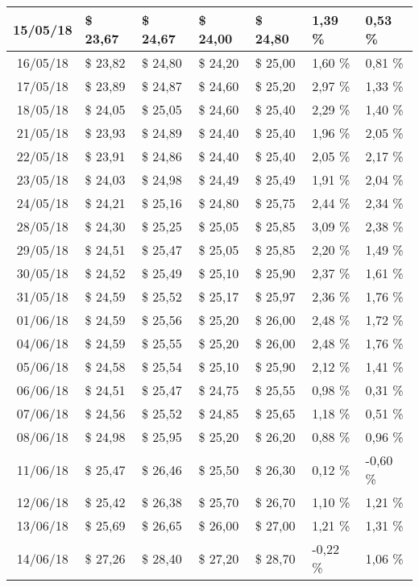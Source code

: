 \begin{center}
\begin{longtable}{|c|p{1.5cm}|p{1.5cm}|p{1.5cm}|p{1.5cm}|p{1.5cm}|p{1.5cm}|}
15/05/18 & \$ 23,67 & \$ 24,67 & \$ 24,00 & \$ 24,80 & 1,39 \% & 0,53 \% \\ \hline
16/05/18 & \$ 23,82 & \$ 24,80 & \$ 24,20 & \$ 25,00 & 1,60 \% & 0,81 \% \\ \hline
17/05/18 & \$ 23,89 & \$ 24,87 & \$ 24,60 & \$ 25,20 & 2,97 \% & 1,33 \% \\ \hline
18/05/18 & \$ 24,05 & \$ 25,05 & \$ 24,60 & \$ 25,40 & 2,29 \% & 1,40 \% \\ \hline
21/05/18 & \$ 23,93 & \$ 24,89 & \$ 24,40 & \$ 25,40 & 1,96 \% & 2,05 \% \\ \hline
22/05/18 & \$ 23,91 & \$ 24,86 & \$ 24,40 & \$ 25,40 & 2,05 \% & 2,17 \% \\ \hline
23/05/18 & \$ 24,03 & \$ 24,98 & \$ 24,49 & \$ 25,49 & 1,91 \% & 2,04 \% \\ \hline
24/05/18 & \$ 24,21 & \$ 25,16 & \$ 24,80 & \$ 25,75 & 2,44 \% & 2,34 \% \\ \hline
28/05/18 & \$ 24,30 & \$ 25,25 & \$ 25,05 & \$ 25,85 & 3,09 \% & 2,38 \% \\ \hline
29/05/18 & \$ 24,51 & \$ 25,47 & \$ 25,05 & \$ 25,85 & 2,20 \% & 1,49 \% \\ \hline
30/05/18 & \$ 24,52 & \$ 25,49 & \$ 25,10 & \$ 25,90 & 2,37 \% & 1,61 \% \\ \hline
31/05/18 & \$ 24,59 & \$ 25,52 & \$ 25,17 & \$ 25,97 & 2,36 \% & 1,76 \% \\ \hline
01/06/18 & \$ 24,59 & \$ 25,56 & \$ 25,20 & \$ 26,00 & 2,48 \% & 1,72 \% \\ \hline
04/06/18 & \$ 24,59 & \$ 25,55 & \$ 25,20 & \$ 26,00 & 2,48 \% & 1,76 \% \\ \hline
05/06/18 & \$ 24,58 & \$ 25,54 & \$ 25,10 & \$ 25,90 & 2,12 \% & 1,41 \% \\ \hline
06/06/18 & \$ 24,51 & \$ 25,47 & \$ 24,75 & \$ 25,55 & 0,98 \% & 0,31 \% \\ \hline
07/06/18 & \$ 24,56 & \$ 25,52 & \$ 24,85 & \$ 25,65 & 1,18 \% & 0,51 \% \\ \hline
08/06/18 & \$ 24,98 & \$ 25,95 & \$ 25,20 & \$ 26,20 & 0,88 \% & 0,96 \% \\ \hline
11/06/18 & \$ 25,47 & \$ 26,46 & \$ 25,50 & \$ 26,30 & 0,12 \% & -0,60 \% \\ \hline
12/06/18 & \$ 25,42 & \$ 26,38 & \$ 25,70 & \$ 26,70 & 1,10 \% & 1,21 \% \\ \hline
13/06/18 & \$ 25,69 & \$ 26,65 & \$ 26,00 & \$ 27,00 & 1,21 \% & 1,31 \% \\ \hline
14/06/18 & \$ 27,26 & \$ 28,40 & \$ 27,20 & \$ 28,70 & -0,22 \% & 1,06 \% \\ \hline

\end{longtable}
\end{center}
